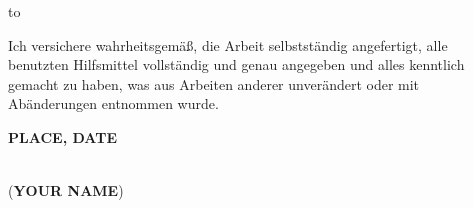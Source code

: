 \vspace*{36\baselineskip}
\hbox to \textwidth{\hrulefill}
\par
Ich versichere wahrheitsgem\"a\ss, die Arbeit selbstst\"andig angefertigt, alle benutzten Hilfsmittel vollst\"andig und genau angegeben und alles kenntlich gemacht zu haben, was aus Arbeiten anderer unver\"andert oder mit Ab\"anderungen entnommen wurde.

\textbf{PLACE, DATE}
\vspace{1.5cm}

\dotfill\hspace*{8.0cm}\\
\hspace*{2cm}(\textbf{YOUR NAME}) %

\thispagestyle{empty}
